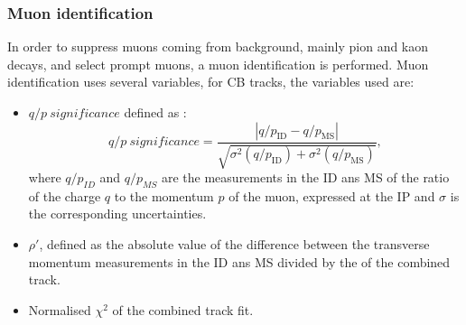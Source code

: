 \subsubsection{Muon identification}
\label{chap2:Objects:Muon:ID}
In order to suppress muons coming from background, mainly pion and kaon decays, and select prompt muons, a muon identification is performed. Muon identification uses several variables, for CB tracks, the variables used are: 
\begin{itemize}
    \item $q/p \ significance$ defined as : 
    \begin{equation}
        q / p \ significance=\frac{\left|q / p_{\mathrm{ID}}-q / p_{\mathrm{MS}}\right|}{\sqrt{\sigma^{2}\left(q / p_{\mathrm{ID}}\right)+\sigma^{2}\left(q / p_{\mathrm{MS}}\right)}},
    \end{equation}
    where $q/p_{ID}$ and $q/p_{MS}$ are the measurements in the ID ans MS of the ratio of the charge $q$ to the momentum $p$ of the muon, expressed at the IP and $\sigma$ is the corresponding uncertainties. 
    \item $\rho'$, defined as the absolute value of the difference between the transverse momentum measurements in the ID ans MS divided by the \pT of the combined track.
    \item Normalised $\chi^2$ of the combined track fit. 
\end{itemize}

